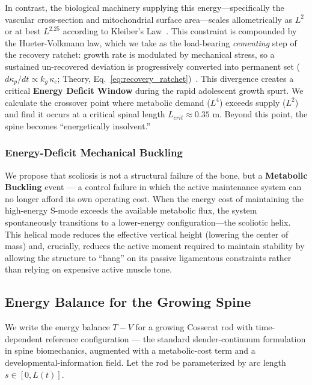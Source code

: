 In contrast, the biological machinery supplying this energy—specifically the vascular cross-section and mitochondrial surface area—scales allometrically as $L^2$ or at best $L^{2.25}$ according to Kleiber's Law~\cite{west1997general, rolfe1997cellular}. This constraint is compounded by the Hueter-Volkmann law, which we take as the load-bearing \emph{cementing} step of the recovery ratchet: growth rate is modulated by mechanical stress, so a sustained un-recovered deviation is progressively converted into permanent set ($d\kappa_p/dt \propto k_g\,\kappa_e$; Theory, Eq.~\ref{eq:recovery_ratchet})~\cite{villemure2009growth, stokes2007growth}. This divergence creates a critical \textbf{Energy Deficit Window} during the rapid adolescent growth spurt.
We calculate the crossover point where metabolic demand ($L^4$) exceeds supply ($L^2$) and find it occurs at a critical spinal length $L_{crit} \approx 0.35$ m. Beyond this point, the spine becomes ``energetically insolvent.''

\subsubsection{Energy-Deficit Mechanical Buckling}
We propose that scoliosis is not a structural failure of the bone, but a \textbf{Metabolic Buckling} event --- a control failure in which the active maintenance system can no longer afford its own operating cost. When the energy cost of maintaining the high-energy S-mode exceeds the available metabolic flux, the system spontaneously transitions to a lower-energy configuration—the scoliotic helix. This helical mode reduces the effective vertical height (lowering the center of mass) and, crucially, reduces the active moment required to maintain stability by allowing the structure to ``hang'' on its passive ligamentous constraints rather than relying on expensive active muscle tone.

\subsection{Energy Balance for the Growing Spine}

We write the energy balance $T - V$ for a growing Cosserat rod with time-dependent reference configuration --- the standard slender-continuum formulation in spine biomechanics, augmented with a metabolic-cost term and a developmental-information field. Let the rod be parameterized by arc length $s \in [0, L(t)]$.

